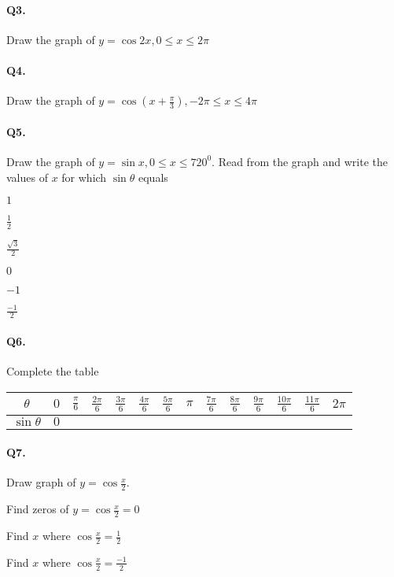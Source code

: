 \documentclass{article}
\begin{document}
\paragraph{Q3.}
Draw the graph of $y=\cos 2x, 0 \leq x \leq 2\pi$

\paragraph{Q4.}
Draw the graph of $y=\cos(x+\frac{\pi}{3}), -2\pi \leq x \leq 4\pi$

\paragraph{Q5.}
Draw the graph of $y=\sin x, 0 \leq x \leq 720^{0}$.
Read from the graph and write the values of $x$ for which $\sin\theta$ equals

\begin{enumerate*}[label=\alph*)]
  \item $1$
  \item $\frac{1}{2}$
  \item $\frac{\sqrt{3}}{2}$
  \item $0$
  \item $-1$
  \item $\frac{-1}{2}$
\end{enumerate*}

\paragraph{Q6.}
Complete the table

\begin{tabular}{|c|c|c|c|c|c|c|c|c|c|c|c|c|c|}
  \hline
$\theta$ & $0$ & $\frac{\pi}{6}$ & $\frac{2\pi}{6}$ & $\frac{3\pi}{6}$ & $\frac{4\pi}{6}$ & $\frac{5\pi}{6}$ & $\pi$ & $\frac{7\pi}{6}$ & $\frac{8\pi}{6}$ & $\frac{9\pi}{6}$ & $\frac{10\pi}{6}$ & $\frac{11\pi}{6}$ & $2\pi$ \\[3pt]
  \hline
$\sin\theta$ & $0$ & & & & & & & & & & & &\\
  \hline
\end{tabular}

\paragraph{Q7.}
Draw graph of $y = \cos \frac{x}{2}$.

\begin{enumerate*}[label=\alph*)]
  \item Find zeros of $y = \cos \frac{x}{2} = 0$
  \item Find $x$ where $\cos \frac{x}{2} = \frac{1}{2}$
  \item Find $x$ where $\cos \frac{x}{2} = \frac{-1}{2}$
\end{enumerate*}
\end{document}
